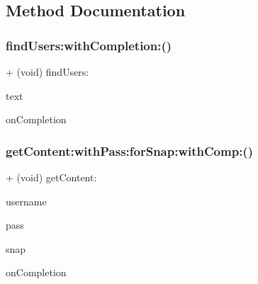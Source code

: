 \subsection{Method Documentation}
\hypertarget{interface_get_a8cfe18ecbe3c58ff22d22b734ecd53cf}{}\label{interface_get_a8cfe18ecbe3c58ff22d22b734ecd53cf} 
\subsubsection{\texorpdfstring{find\+Users\+:with\+Completion\+:()}{findUsers:withCompletion:()}}
{\footnotesize\ttfamily + (void) find\+Users\+: \begin{DoxyParamCaption}\item[{(N\+S\+String $\ast$)}]{text }\item[{withCompletion:(void($^\wedge$)(B\+O\+OL, id))}]{on\+Completion }\end{DoxyParamCaption}}

\hypertarget{interface_get_aeabf77fd137db06ffa9defbb08a84ce2}{}\label{interface_get_aeabf77fd137db06ffa9defbb08a84ce2} 
\subsubsection{\texorpdfstring{get\+Content\+:with\+Pass\+:for\+Snap\+:with\+Comp\+:()}{getContent:withPass:forSnap:withComp:()}}
{\footnotesize\ttfamily + (void) get\+Content\+: \begin{DoxyParamCaption}\item[{(N\+S\+String $\ast$)}]{username }\item[{withPass:(N\+S\+String $\ast$)}]{pass }\item[{forSnap:(\hyperlink{interface_snap}{Snap} $\ast$)}]{snap }\item[{withComp:(void($^\wedge$)(B\+O\+OL, id))}]{on\+Completion }\end{DoxyParamCaption}}

\hypertarget{interface_get_ad2ab0ea6e3e0b8253cfe9998196d1cc5}{}\label{interface_get_ad2ab0ea6e3e0b8253cfe9998196d1cc5} 
